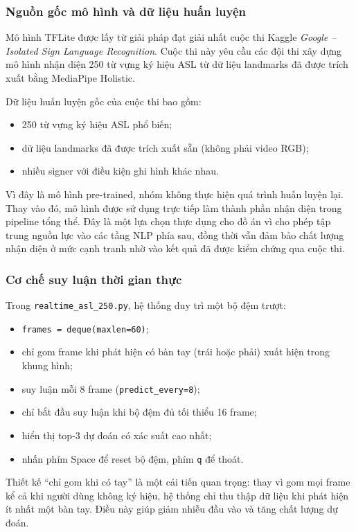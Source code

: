 \subsubsection{Nguồn gốc mô hình và dữ liệu huấn luyện}

Mô hình TFLite được lấy từ giải pháp đạt giải nhất cuộc thi Kaggle
\textit{Google -- Isolated Sign Language Recognition}. Cuộc thi này yêu cầu các đội thi xây
dựng mô hình nhận diện 250 từ vựng ký hiệu ASL từ dữ liệu landmarks đã được trích xuất
bằng MediaPipe Holistic.

Dữ liệu huấn luyện gốc của cuộc thi bao gồm:
\begin{itemize}
    \item 250 từ vựng ký hiệu ASL phổ biến;
    \item dữ liệu landmarks đã được trích xuất sẵn (không phải video RGB);
    \item nhiều signer với điều kiện ghi hình khác nhau.
\end{itemize}

Vì đây là mô hình pre-trained, nhóm không thực hiện quá trình huấn luyện lại. Thay vào đó,
mô hình được sử dụng trực tiếp làm thành phần nhận diện trong pipeline tổng thể. Đây là một
lựa chọn thực dụng cho đồ án vì cho phép tập trung nguồn lực vào các tầng NLP phía sau,
đồng thời vẫn đảm bảo chất lượng nhận diện ở mức cạnh tranh nhờ vào kết quả đã được kiểm
chứng qua cuộc thi.

\subsubsection{Cơ chế suy luận thời gian thực}

Trong \texttt{realtime\_asl\_250.py}, hệ thống duy trì một bộ đệm trượt:
\begin{itemize}
    \item \texttt{frames = deque(maxlen=60)};
    \item chỉ gom frame khi phát hiện có bàn tay (trái hoặc phải) xuất hiện trong khung hình;
    \item suy luận mỗi 8 frame (\texttt{predict\_every=8});
    \item chỉ bắt đầu suy luận khi bộ đệm đủ tối thiểu 16 frame;
    \item hiển thị top-3 dự đoán có xác suất cao nhất;
    \item nhấn phím Space để reset bộ đệm, phím \texttt{q} để thoát.
\end{itemize}

Thiết kế ``chỉ gom khi có tay'' là một cải tiến quan trọng: thay vì gom mọi frame kể cả khi
người dùng không ký hiệu, hệ thống chỉ thu thập dữ liệu khi phát hiện ít nhất một bàn tay.
Điều này giúp giảm nhiễu đầu vào và tăng chất lượng dự đoán.

